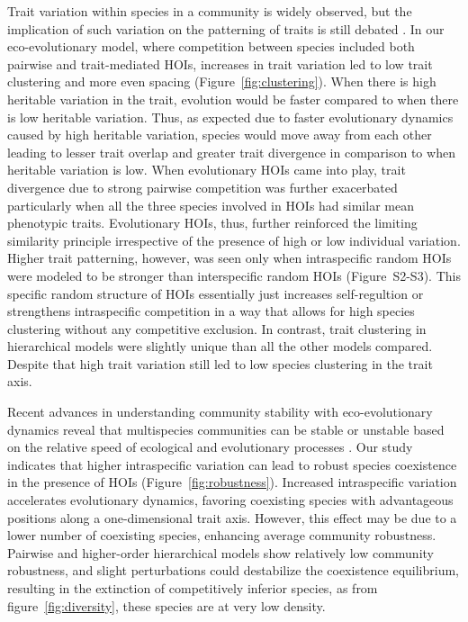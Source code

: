 \documentclass[11pt]{article}
\begin{document}
Trait variation within species in a community is widely observed, but the implication of such variation on the patterning of traits is still debated \citep{gotzenberger_ecological_2012}. In our eco-evolutionary model, where competition between species included both pairwise and trait-mediated HOIs, increases in trait variation led to low trait clustering and more even spacing (Figure~\ref{fig:clustering}).  When there is high heritable variation in the trait, evolution would be faster compared to when there is low heritable variation. Thus, as expected due to faster evolutionary dynamics caused by high heritable variation, species would move away from each other leading to lesser trait overlap and greater trait divergence in comparison to when heritable variation is low. When evolutionary HOIs came into play, trait divergence due to strong pairwise competition was further exacerbated particularly when all the three species involved in HOIs had similar mean phenotypic traits. Evolutionary HOIs, thus, further reinforced the limiting similarity principle irrespective of the presence of high or low individual variation. Higher trait patterning, however, was seen only when intraspecific random HOIs were modeled to be stronger than interspecific random HOIs (Figure~S2-S3). This specific random structure of HOIs essentially just increases self-regultion or strengthens intraspecific competition in a way that allows for high species clustering without any competitive exclusion. In contrast, trait clustering in hierarchical models were slightly unique than all the other models compared. Despite that high trait variation still led to low species clustering in the trait axis. 

Recent advances in understanding community stability with eco-evolutionary dynamics reveal that multispecies communities can be stable or unstable based on the relative speed of ecological and evolutionary processes \citep{patel_partitioning_2018}. Our study indicates that higher intraspecific variation can lead to robust species coexistence in the presence of HOIs (Figure~\ref{fig:robustness}). Increased intraspecific variation accelerates evolutionary dynamics, favoring coexisting species with advantageous positions along a one-dimensional trait axis. However, this effect may be due to a lower number of coexisting species, enhancing average community robustness. Pairwise and higher-order hierarchical models show relatively low community robustness, and slight perturbations could destabilize the coexistence equilibrium, resulting in the extinction of competitively inferior species, as from figure~\ref{fig:diversity}, these species are at very low density.
\end{document}
